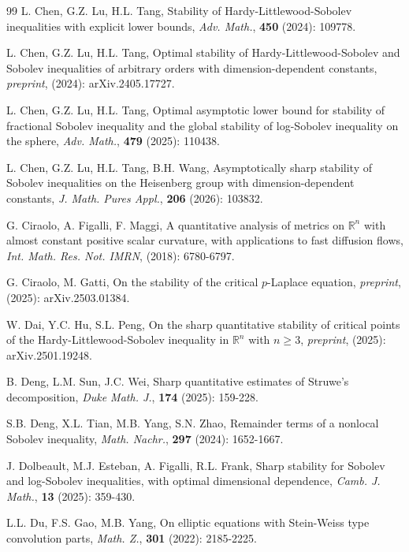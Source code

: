 \documentclass[11pt]{article}
\begin{document}
\begin{thebibliography}{99}
 L. Chen, G.Z. Lu, H.L. Tang,
Stability of Hardy-Littlewood-Sobolev inequalities with explicit lower bounds, {\em Adv. Math.}, {\bf 450} (2024): 109778.

 L. Chen, G.Z. Lu, H.L. Tang,
Optimal stability of Hardy-Littlewood-Sobolev and Sobolev inequalities of arbitrary orders with dimension-dependent constants, {\em preprint}, (2024): arXiv.2405.17727.

 L. Chen, G.Z. Lu, H.L. Tang,
Optimal asymptotic lower bound for stability of fractional Sobolev inequality and the global stability of log-Sobolev inequality on the sphere, {\em Adv. Math.}, {\bf 479} (2025): 110438.

 L. Chen, G.Z. Lu, H.L. Tang, B.H. Wang,
Asymptotically sharp stability of Sobolev inequalities on the Heisenberg group
with dimension-dependent constants, {\em J. Math. Pures Appl.}, {\bf 206} (2026): 103832.

 G. Ciraolo, A. Figalli, F. Maggi,
A quantitative analysis of metrics on
$\mathbb{R}^n$ with almost constant positive scalar curvature, with
applications to fast diffusion flows,
{\em Int. Math. Res. Not. IMRN}, (2018): 6780-6797.

 G. Ciraolo, M. Gatti,
On the stability of the critical $p$-Laplace equation,
{\em preprint}, (2025): arXiv.2503.01384.

 W. Dai, Y.C. Hu, S.L. Peng,
On the sharp quantitative stability of critical points of the Hardy-Littlewood-Sobolev inequality in $\mathbb{R}^{n}$ with $n\geq3$,
{\em preprint}, (2025): arXiv.2501.19248.

 B. Deng, L.M. Sun, J.C. Wei,
Sharp quantitative estimates of Struwe's decomposition,
{\em Duke Math. J.}, {\bf 174} (2025): 159-228.

 S.B. Deng, X.L. Tian, M.B. Yang, S.N. Zhao,
Remainder terms of a nonlocal Sobolev inequality,
{\em Math. Nachr.}, {\bf 297} (2024): 1652-1667.

J. Dolbeault, M.J. Esteban, A. Figalli, R.L. Frank,
Sharp stability for Sobolev and log-Sobolev inequalities, with optimal dimensional dependence,
{\em Camb. J. Math.}, {\bf 13} (2025): 359-430.

L.L. Du, F.S. Gao, M.B. Yang,
On elliptic equations with Stein-Weiss type convolution parts, {\em Math. Z.}, {\bf 301} (2022): 2185-2225.


\end{thebibliography}
\end{document}
